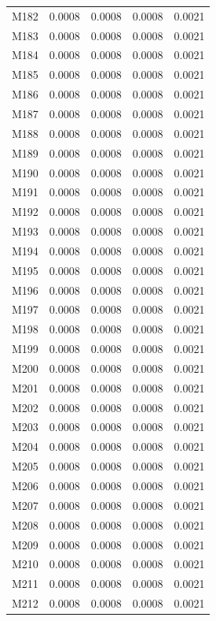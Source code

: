 \begin{longtable}{lrrrr}
M182 & 0.0008 & 0.0008 & 0.0008 & 0.0021 \\
M183 & 0.0008 & 0.0008 & 0.0008 & 0.0021 \\
M184 & 0.0008 & 0.0008 & 0.0008 & 0.0021 \\
M185 & 0.0008 & 0.0008 & 0.0008 & 0.0021 \\
M186 & 0.0008 & 0.0008 & 0.0008 & 0.0021 \\
M187 & 0.0008 & 0.0008 & 0.0008 & 0.0021 \\
M188 & 0.0008 & 0.0008 & 0.0008 & 0.0021 \\
M189 & 0.0008 & 0.0008 & 0.0008 & 0.0021 \\
M190 & 0.0008 & 0.0008 & 0.0008 & 0.0021 \\
M191 & 0.0008 & 0.0008 & 0.0008 & 0.0021 \\
M192 & 0.0008 & 0.0008 & 0.0008 & 0.0021 \\
M193 & 0.0008 & 0.0008 & 0.0008 & 0.0021 \\
M194 & 0.0008 & 0.0008 & 0.0008 & 0.0021 \\
M195 & 0.0008 & 0.0008 & 0.0008 & 0.0021 \\
M196 & 0.0008 & 0.0008 & 0.0008 & 0.0021 \\
M197 & 0.0008 & 0.0008 & 0.0008 & 0.0021 \\
M198 & 0.0008 & 0.0008 & 0.0008 & 0.0021 \\
M199 & 0.0008 & 0.0008 & 0.0008 & 0.0021 \\
M200 & 0.0008 & 0.0008 & 0.0008 & 0.0021 \\
M201 & 0.0008 & 0.0008 & 0.0008 & 0.0021 \\
M202 & 0.0008 & 0.0008 & 0.0008 & 0.0021 \\
M203 & 0.0008 & 0.0008 & 0.0008 & 0.0021 \\
M204 & 0.0008 & 0.0008 & 0.0008 & 0.0021 \\
M205 & 0.0008 & 0.0008 & 0.0008 & 0.0021 \\
M206 & 0.0008 & 0.0008 & 0.0008 & 0.0021 \\
M207 & 0.0008 & 0.0008 & 0.0008 & 0.0021 \\
M208 & 0.0008 & 0.0008 & 0.0008 & 0.0021 \\
M209 & 0.0008 & 0.0008 & 0.0008 & 0.0021 \\
M210 & 0.0008 & 0.0008 & 0.0008 & 0.0021 \\
M211 & 0.0008 & 0.0008 & 0.0008 & 0.0021 \\
M212 & 0.0008 & 0.0008 & 0.0008 & 0.0021 \\

\end{longtable}
